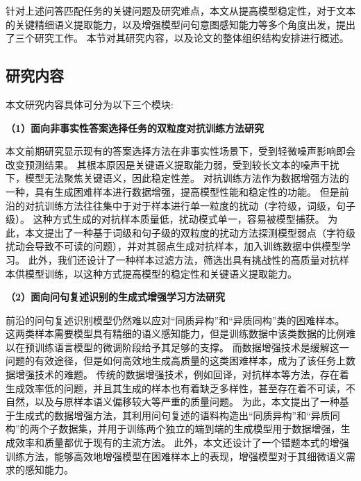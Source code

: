 针对上述问答匹配任务的关键问题及研究难点，本文从提高模型稳定性，对于文本的关键精细语义提取能力，以及增强模型问句意图感知能力等多个角度出发，提出了三个研究工作。
本节对其研究内容，以及论文的整体组织结构安排进行概述。

\subsection{研究内容}

本文研究内容具体可分为以下三个模块:

\textbf{\songti （1）面向非事实性答案选择任务的双粒度对抗训练方法研究}

本文前期研究显示现有的答案选择方法在非事实性场景下，受到轻微噪声影响即会改变预测结果。
其根本原因是关键语义提取能力弱，受到较长文本的噪声干扰下，模型无法聚焦关键语义，因此稳定性差。
对抗训练方法作为数据增强方法的一种，具有生成困难样本进行数据增强，提高模型性能和稳定性的功能。
但是前沿的对抗训练方法往往集中于对于样本进行单一粒度的扰动（字符级，词级，句子级）。
这种方式生成的对抗样本质量低，扰动模式单一，容易被模型捕获。
为此，本文提出了一种基于词级和句子级的双粒度的扰动方法探测模型弱点（字符级扰动会导致不可读的问题），并对其弱点生成对抗样本，加入训练数据中供模型学习。
此外，我们还设计了一种样本过滤方法，筛选出具有挑战性的高质量对抗样本供模型训练，以这种方式提高模型的稳定性和关键语义提取能力。

\textbf{\songti （2）面向问句复述识别的生成式增强学习方法研究}

前沿的问句复述识别模型仍然难以应对“同质异构”和“异质同构”类的困难样本。
这两类样本需要模型具有精细的语义感知能力，但是训练数据中该类数据的比例难以在预训练语言模型的微调阶段给予其足够的支撑。
而数据增强技术是缓解这一问题的有效途径，但是如何高效地生成高质量的这类困难样本，成为了该任务上数据增强技术的难题。
传统的数据增强技术，例如回译，对抗样本等方法，存在着生成效率低的问题，并且其生成的样本也有着缺乏多样性，甚至存在着不可读，不自然，以及与原样本语义偏移较大等严重的质量问题。
为此，本文提出了一种基于生成式的数据增强方法，其利用问句复述的语料构造出“同质异构”和“异质同构”的两个子数据集，并用于训练两个独立的端到端的生成模型用于数据增强，生成效率和质量都优于现有的主流方法。
此外，本文还设计了一个错题本式的增强训练方法，能够高效地增强模型在困难样本上的表现，增强模型对于其细微语义需求的感知能力。


